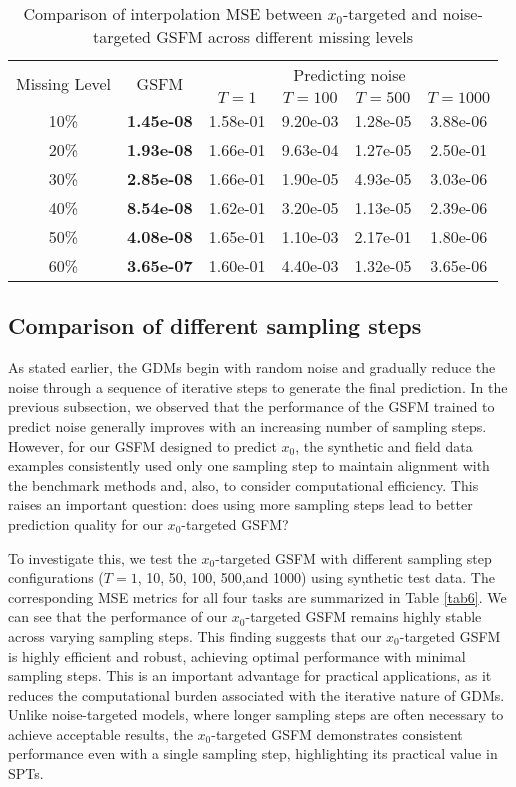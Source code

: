 \begin{table}[htbp]
    \centering
    \caption{Comparison of interpolation MSE between $x_0$-targeted and noise-targeted GSFM across different missing levels}
    \begin{tabular}{@{} c c c c c c @{}}
        \toprule
        \multirow{2}{*}{\centering Missing Level} & \multirow{2}{*}{\centering GSFM} & \multicolumn{4}{c}{Predicting noise} \\ \cmidrule(lr){3-6}
         &  & $T=1$ & $T=100$ & $T=500$ & $T=1000$ \\ 
        \hline
        10\% & \textbf{1.45e-08} & 1.58e-01 & 9.20e-03 & 1.28e-05 & 3.88e-06 \\
        20\% & \textbf{1.93e-08} & 1.66e-01 & 9.63e-04 & 1.27e-05 & 2.50e-01 \\
        30\% & \textbf{2.85e-08} & 1.66e-01 & 1.90e-05 & 4.93e-05 & 3.03e-06 \\
        40\% & \textbf{8.54e-08} & 1.62e-01 & 3.20e-05 & 1.13e-05 & 2.39e-06 \\
        50\% & \textbf{4.08e-08} & 1.65e-01 & 1.10e-03 & 2.17e-01 & 1.80e-06 \\
        60\% & \textbf{3.65e-07} & 1.60e-01 & 4.40e-03 & 1.32e-05 & 3.65e-06 \\
        \bottomrule
    \end{tabular}
    \label{tab5}
\end{table}

\subsection{Comparison of different sampling steps}
As stated earlier, the GDMs begin with random noise and gradually reduce the noise through a sequence of iterative steps to generate the final prediction. In the previous subsection, we observed that the performance of the GSFM trained to predict noise generally improves with an increasing number of sampling steps. However, for our GSFM designed to predict $x_0$, the synthetic and field data examples consistently used only one sampling step to maintain alignment with the benchmark methods and, also, to consider computational efficiency. This raises an important question: does using more sampling steps lead to better prediction quality for our $x_0$-targeted GSFM? 

To investigate this, we test the $x_0$-targeted GSFM with different sampling step configurations ($T=1$, 10, 50, 100, 500,and 1000) using synthetic test data. The corresponding MSE metrics for all four tasks are summarized in Table \ref{tab6}. We can see that the performance of our $x_0$-targeted GSFM remains highly stable across varying sampling steps. This finding suggests that our $x_0$-targeted GSFM is highly efficient and robust, achieving optimal performance with minimal sampling steps. This is an important advantage for practical applications, as it reduces the computational burden associated with the iterative nature of GDMs. Unlike noise-targeted models, where longer sampling steps are often necessary to achieve acceptable results, the $x_0$-targeted GSFM demonstrates consistent performance even with a single sampling step, highlighting its practical value in SPTs. 

